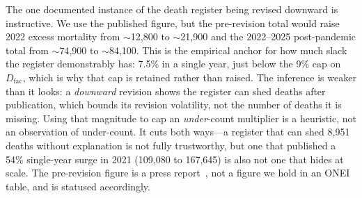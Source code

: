 \documentclass[11pt,a4paper]{article}
\begin{document}
The one documented instance of the death register being revised downward is instructive.
We use the published figure, but the pre-revision total would raise 2022 excess mortality from $\sim$12{,}800 to $\sim$21{,}900 and the 2022--2025 post-pandemic total from $\sim$74{,}900 to $\sim$84{,}100.
This is the empirical anchor for how much slack the register demonstrably has: 7.5\% in a single year, just below the 9\% cap on $D_{\mathrm{fac}}$, which is why that cap is retained rather than raised.
The inference is weaker than it looks: a \emph{downward} revision shows the register can shed deaths after publication, which bounds its revision volatility, not the number of deaths it is missing. Using that magnitude to cap an \emph{under}-count multiplier is a heuristic, not an observation of under-count. It cuts both ways---a register that can shed 8{,}951 deaths without explanation is not fully trustworthy, but one that published a 54\% single-year surge in 2021 (109{,}080 to 167{,}645) is also not one that hides at scale. The pre-revision figure is a press report~\citep{press_register_2022}, not a figure we hold in an ONEI table, and is statused accordingly.
\end{document}
